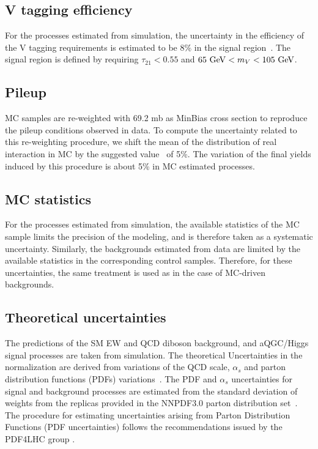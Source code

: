 \subsection{V tagging efficiency}

For the processes estimated from simulation, the uncertainty in the efficiency of the V tagging requirements is estimated to be $8\%$ in the signal region~\cite{jettagging}. The signal region is defined by requiring $\tau_{21}<0.55$ and $ 65 ~\mathrm{GeV} < m_{V} < 105 ~\mathrm{GeV}$. 

\subsection{Pileup}

MC samples are re-weighted with 69.2 mb as MinBias cross section to reproduce the pileup conditions observed in data.
To compute the uncertainty related to this re-weighting procedure, we
shift the mean of the distribution of real interaction in MC by the
suggested value~\cite{twiki:Pileup} of 5\%. 
The variation of the final yields induced by
this procedure is about 5\% in MC estimated processes. 


\subsection{MC statistics}

For the processes estimated from simulation, the
available statistics of the MC sample limits the precision of the
modeling, and is therefore taken as a systematic
uncertainty. Similarly, the backgrounds estimated from data are
limited by the available statistics in the corresponding control
samples. Therefore, for these uncertainties, the same treatment is
used as in the case of MC-driven backgrounds.

\subsection{Theoretical uncertainties}
The predictions of the SM EW and QCD diboson background, and aQGC/Higgs signal processes are taken from simulation. The theoretical Uncertainties in the normalization are derived from variations of the QCD scale, $\alpha_{s}$
and parton distribution functions (PDFs) variations~\cite{Botje:2011sn,Alekhin:2011sk,Lai:2010vv,Martin2009,Ball:2011mu}.
The PDF and $\alpha_s$ uncertainties for signal and background processes are estimated from the standard deviation of weights from the replicas provided in the NNPDF3.0 parton distribution set~\cite{nnpdf}. The procedure for estimating uncertainties arising from Parton Distribution Functions (PDF uncertainties) follows the recommendations issued by the PDF4LHC group \cite{Butterworth2015}.

